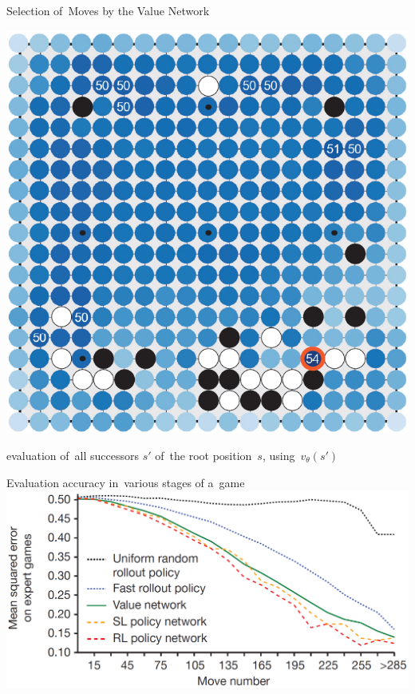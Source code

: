 \documentclass{beamer}
\begin{document}
{    \begin{frame}{Selection of~Moves by the Value Network}
      \begin{center}
        \includegraphics[height=.8\textheight]{../img/move_selection_by_value_network.png}

        \tiny
        evaluation of~all successors $s'$ of~the root position~$s$, using~$v_\theta(s′)$
      \end{center}
    \end{frame}

    \begin{frame}{Evaluation accuracy in~various stages of a~game}
      \includegraphics[width=\textwidth]{../img/policies_move_numbers_vs_MSE.png}


\end{frame}}
\end{document}
